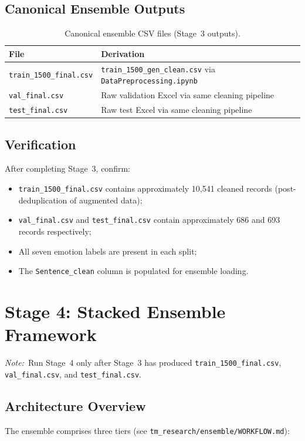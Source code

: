 \documentclass[11pt,a4paper]{article}
\newcommand{\repo}[1]{\texttt{#1}}
\newcommand{\note}[1]{\textit{Note:}~#1}
\begin{document}
\subsection{Canonical Ensemble Outputs}
\begin{table}[htbp]
  \centering
  \caption{Canonical ensemble CSV files (Stage~3 outputs).}
  \label{tab:final-csv}
  \begin{tabular}{@{}ll@{}}
    \toprule
    File & Derivation \\
    \midrule
    \repo{train\_1500\_final.csv} & \repo{train\_1500\_gen\_clean.csv} via \repo{DataPreprocessing.ipynb} \\
    \repo{val\_final.csv} & Raw validation Excel via same cleaning pipeline \\
    \repo{test\_final.csv} & Raw test Excel via same cleaning pipeline \\
    \bottomrule
  \end{tabular}
\end{table}

\subsection{Verification}
After completing Stage~3, confirm:
\begin{itemize}[nosep]
  \item \repo{train\_1500\_final.csv} contains approximately 10{,}541 cleaned records (post-deduplication of augmented data);
  \item \repo{val\_final.csv} and \repo{test\_final.csv} contain approximately 686 and 693 records respectively;
  \item All seven emotion labels are present in each split;
  \item The \texttt{Sentence\_clean} column is populated for ensemble loading.
\end{itemize}

\section{Stage 4: Stacked Ensemble Framework}
\label{sec:ensemble}

\note{Run Stage~4 only after Stage~3 has produced \repo{train\_1500\_final.csv}, \repo{val\_final.csv}, and \repo{test\_final.csv}.}

\subsection{Architecture Overview}
The ensemble comprises three tiers (see \repo{tm\_research/ensemble/WORKFLOW.md}):
\end{document}
